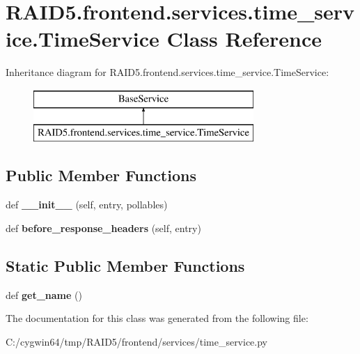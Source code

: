 \hypertarget{class_r_a_i_d5_1_1frontend_1_1services_1_1time__service_1_1_time_service}{}\section{R\+A\+I\+D5.\+frontend.\+services.\+time\+\_\+service.\+Time\+Service Class Reference}
\label{class_r_a_i_d5_1_1frontend_1_1services_1_1time__service_1_1_time_service}
Inheritance diagram for R\+A\+I\+D5.\+frontend.\+services.\+time\+\_\+service.\+Time\+Service\+:\begin{figure}[H]
\begin{center}
\leavevmode
\includegraphics[height=2.000000cm]{class_r_a_i_d5_1_1frontend_1_1services_1_1time__service_1_1_time_service}
\end{center}
\end{figure}
\subsection*{Public Member Functions}
\begin{DoxyCompactItemize}
\item 
\mbox{\label{class_r_a_i_d5_1_1frontend_1_1services_1_1time__service_1_1_time_service_a38cf8fb561c015253cc427e640b1e570}} 
def {\bfseries \+\_\+\+\_\+init\+\_\+\+\_\+} (self, entry, pollables)
\item 
\mbox{\label{class_r_a_i_d5_1_1frontend_1_1services_1_1time__service_1_1_time_service_aff2f55df46713508f13b23b09b0773fe}} 
def {\bfseries before\+\_\+response\+\_\+headers} (self, entry)
\end{DoxyCompactItemize}
\subsection*{Static Public Member Functions}
\begin{DoxyCompactItemize}
\item 
\mbox{\label{class_r_a_i_d5_1_1frontend_1_1services_1_1time__service_1_1_time_service_a5423d9b5c863fdc89514b9a28b6613a3}} 
def {\bfseries get\+\_\+name} ()
\end{DoxyCompactItemize}


The documentation for this class was generated from the following file\+:\begin{DoxyCompactItemize}
\item 
C\+:/cygwin64/tmp/\+R\+A\+I\+D5/frontend/services/time\+\_\+service.\+py\end{DoxyCompactItemize}
